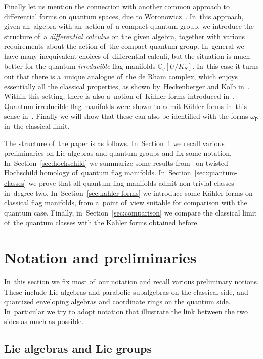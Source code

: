 \documentclass[10pt,a4paper]{amsart}
\numberwithin{equation}{section}
\newcommand{\Cqflag}{\mathbb{C}_q[U / K_S]}
\newcommand{\proj}{\mathsf{P}}
\begin{document}
Finally let us mention the connection with another common approach to differential forms on quantum spaces, due to Woronowicz~\cite{woronowicz}.
In~this approach, given an~algebra with an~action of~a compact quantum group, we introduce the structure of~a \emph{differential calculus} on the given algebra, together with various requirements about the action of~the compact quantum group.
In~general we have many inequivalent choices of~differential calculi, but the situation is much better for the quantum \emph{irreducible} flag manifolds $\Cqflag$.
In~this case it turns out that there is a~unique analogue of~the de Rham complex, which enjoys essentially all the classical properties, as shown by~Heckenberger and Kolb in~\cite{heko06}.
Within this setting, there is also a~notion of~K\"ahler forms introduced in~\cite{obu17}.
Quantum irreducible flag manifolds were shown to admit K\"ahler forms in~this sense in~\cite{mat-kahler}.
Finally we will show that these can also be identified with the forms $\omega_\proj$ in~the classical limit.

The structure of~the paper is as follows.
In~Section~\ref{sec:notations} we recall various preliminaries on Lie algebras and quantum groups and fix some notation.
In~Section~\ref{sec:hochschild} we summarize some results from~\cite{twist-hoch} on twisted Hoch\-schild homology of~quantum flag manifolds.
In~Section~\ref{sec:quantum-classes} we prove that all quantum flag manifolds admit non-trivial classes in~degree two.
In~Section~\ref{sec:kahler-forms} we introduce some K\"ahler forms on classical flag manifolds, from a~point of~view suitable for comparison with the quantum case.
Finally, in~Section~\ref{sec:comparison} we compare the classical limit of~the quantum classes with the K\"ahler forms obtained before.

\section{Notation and preliminaries}
\label{sec:notations}

In~this section we fix most of~our notation and recall various preliminary notions.
These include Lie algebras and parabolic subalgebras on the classical side, and quantized enveloping algebras and coordinate rings on the quantum side.
In~particular we try to adopt notation that illustrate the link between the two sides as much as possible.

\subsection{Lie algebras and Lie groups}
\end{document}
